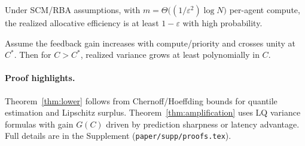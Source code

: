 \begin{theorem}\label{thm:lower}
Under SCM/RBA assumptions, with $m=\Theta\big((1/\varepsilon^2)\log N\big)$ per-agent compute, the realized allocative efficiency is at least $1-\varepsilon$ with high probability.
\end{theorem}

\begin{theorem}\label{thm:amplification}
Assume the feedback gain increases with compute/priority and crosses unity at $C^*$. Then for $C\!>\!C^*$, realized variance grows at least polynomially in $C$.
\end{theorem}

\paragraph{Proof highlights.} Theorem~\ref{thm:lower} follows from Chernoff/Hoeffding bounds for quantile estimation and Lipschitz surplus. Theorem~\ref{thm:amplification} uses LQ variance formulas with gain $G(C)$ driven by prediction sharpness or latency advantage. Full details are in the Supplement (\texttt{paper/supp/proofs.tex}).


